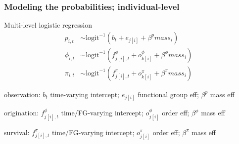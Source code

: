 \documentclass[aspectratio=169]{beamer}
\begin{document}
\begin{frame}
  \frametitle{Modeling the probabilities; individual-level}
  \begin{block}{Multi-level logistic regression}
    \setlength\abovedisplayskip{-0.3cm}
    \begin{align*}
      p_{i, t} &\sim \text{logit}^{-1}(b_{t} + e_{j[i]} + \beta^{p} mass_{i}) \\
      \phi_{i, t} &\sim \text{logit}^{-1}(f^{\phi}_{j[i], t} + o^{\phi}_{k[i]} + \beta^{\phi} mass_{i}) \\
      \pi_{i, t} &\sim \text{logit}^{-1}(f^{\pi}_{j[i], t} + o^{\pi}_{k[i]} + \beta^{\pi} mass_{i})
    \end{align*}
    \begin{scriptsize}
      observation: \(b_{t}\) time-varying intercept; \(e_{j[i]}\) functional group eff; \(\beta^{p}\) mass eff

      origination: \(f^{\phi}_{j[i], t}\) time/FG-varying intercept; \(o^{\phi}_{j[i]}\) order eff; \(\beta^{\phi}\) mass eff

      survival: \(f^{\pi}_{j[i], t}\) time/FG-varying intercept; \(o^{\pi}_{j[i]}\) order eff; \(\beta^{\pi}\) mass eff
    \end{scriptsize}
  \end{block}
\end{frame}
\end{document}
